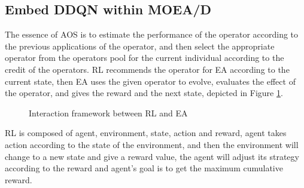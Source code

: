 \documentclass[journal]{IEEEtran}
\begin{document}
\subsection{Embed DDQN within MOEA/D}
The essence of AOS is to estimate the performance of the operator according to the previous applications of the operator, and then select the appropriate operator from the operators pool for the current individual according to the credit of the operators.
RL recommends the operator for EA according to the current state, then EA uses the given operator to evolve, evaluates the effect of the operator, and gives the reward and the next state, depicted in Figure \ref{fig:RLEA}.
\begin{figure}[t]
  \centering
  \caption{Interaction framework between RL and EA}
  \label{fig:RLEA}
\end{figure}
RL is composed of agent, environment, state, action and reward, agent takes action according to the state of the environment, and then the environment will change to a new state and give a reward value, the agent will adjust its strategy according to the reward and agent's goal is to get the maximum cumulative reward.
\end{document}
